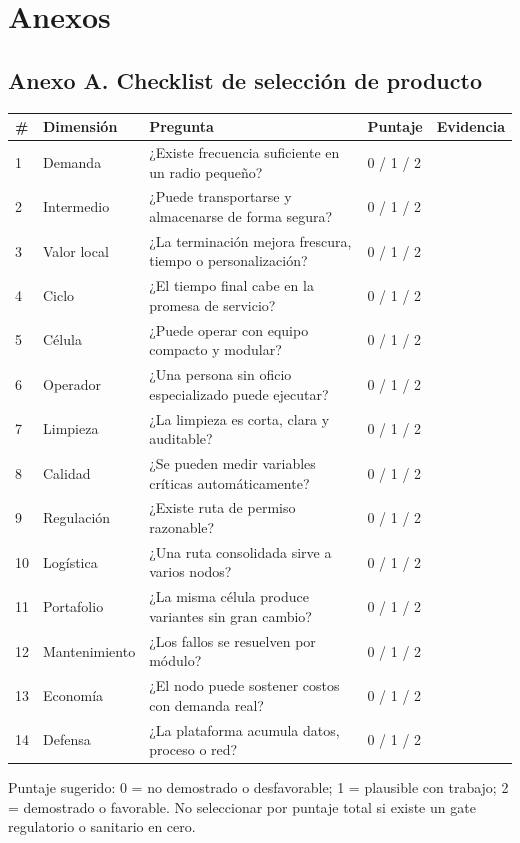 \documentclass[11pt,a4paper]{article}
\begin{document}
\clearpage
\section*{Anexos}

\subsection*{Anexo A. Checklist de selección de producto}
{\small
\begin{xltabular}{\textwidth}{@{}P{0.6cm}P{2.6cm}LP{1.6cm}P{2.6cm}@{}}
\toprule
\textbf{\#} & \textbf{Dimensión} & \textbf{Pregunta} & \textbf{Puntaje} & \textbf{Evidencia}\\ \midrule
{} & Demanda & ¿Existe frecuencia suficiente en un radio pequeño? & 0 / 1 / 2 & \\
2 & Intermedio & ¿Puede transportarse y almacenarse de forma segura? & 0 / 1 / 2 & \\
3 & Valor local & ¿La terminación mejora frescura, tiempo o personalización? & 0 / 1 / 2 & \\
4 & Ciclo & ¿El tiempo final cabe en la promesa de servicio? & 0 / 1 / 2 & \\
5 & Célula & ¿Puede operar con equipo compacto y modular? & 0 / 1 / 2 & \\
6 & Operador & ¿Una persona sin oficio especializado puede ejecutar? & 0 / 1 / 2 & \\
7 & Limpieza & ¿La limpieza es corta, clara y auditable? & 0 / 1 / 2 & \\
8 & Calidad & ¿Se pueden medir variables críticas automáticamente? & 0 / 1 / 2 & \\
9 & Regulación & ¿Existe ruta de permiso razonable? & 0 / 1 / 2 & \\
10 & Logística & ¿Una ruta consolidada sirve a varios nodos? & 0 / 1 / 2 & \\
11 & Portafolio & ¿La misma célula produce variantes sin gran cambio? & 0 / 1 / 2 & \\
12 & Mantenimiento & ¿Los fallos se resuelven por módulo? & 0 / 1 / 2 & \\
13 & Economía & ¿El nodo puede sostener costos con demanda real? & 0 / 1 / 2 & \\
14 & Defensa & ¿La plataforma acumula datos, proceso o red? & 0 / 1 / 2 & \\
\bottomrule
\end{xltabular}}
\noindent Puntaje sugerido: 0 = no demostrado o desfavorable; 1 = plausible con trabajo; 2 = demostrado
o favorable. No seleccionar por puntaje total si existe un gate regulatorio o sanitario en cero.
\end{document}
